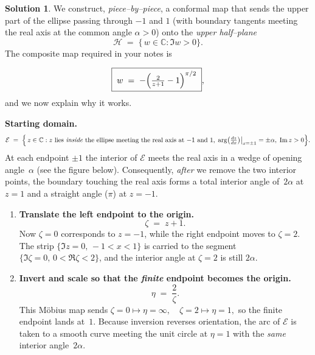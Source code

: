 \documentclass[12pt]{article}
\theoremstyle{definition} %
\newtheorem{solution}{Solution}
\theoremstyle{plain} %
\begin{document}
      \begin{solution}
        We construct, \emph{piece–by–piece}, a conformal map that sends the
        upper part of the ellipse passing through $-1$ and $1$
        (with boundary tangents meeting the real axis at the common angle
        $\alpha>0$) onto the \emph{upper half–plane}
        \[
        \mathcal H \;=\;\{\,w\in\mathbb{C} : \Im w>0\}.
        \]
        The composite map required in your notes is  
        
        \[
        \boxed{\;
           w \;=\;-\Bigl(\tfrac{2}{z+1}-1\Bigr)^{\pi/2}
         \;},
        \]
        and we now explain why it works.
        
        \bigskip
        \noindent
        \textbf{Starting domain.}
        \[
        \mathcal E
          \;=\;
          \Bigl\{\,z\in\mathbb{C} :
             \text{$z$ lies \emph{inside} the ellipse
             meeting the real axis at $-1$ and $1$,}
             \;
             \arg\bigl(\tfrac{dz}{dx}\bigr)\big|_{x=\pm1}=\pm\alpha,
             \;
             \Im z>0
          \Bigr\}.
        \]
        At each endpoint $\pm1$ the interior of $\mathcal E$
        meets the real axis in a wedge of opening
        angle~$\alpha$ (see the figure below).
        Consequently, \emph{after} we remove the two interior points,
        the boundary touching the real axis forms a total interior angle
        of~$2\alpha$ at~$z=1$ and a straight angle ($\pi$) at $z=-1$.
        
        \medskip
        \begin{enumerate}[label=\textbf{Step \arabic*:}, itemsep=1.4ex]
        
        \item  \textbf{Translate the left endpoint to the origin.}  
        \[
        \zeta
           \;=\;z+1.
        \]
        Now $\zeta=0$ corresponds to $z=-1$, while the right endpoint
        moves to $\zeta=2$.
        The strip $\bigl\{\Im z=0,\, -1<x<1\bigr\}$ is carried to the segment
        $\bigl\{\Im\zeta=0,\, 0<\Re\zeta<2\bigr\}$,
        and the interior angle at $\zeta=2$ is still $2\alpha$.
        
        \item  \textbf{Invert and scale so that the \emph{finite} endpoint
              becomes the origin.}  
        \[
        \eta
           \;=\;
           \frac{2}{\zeta}.
        \]
        This Möbius map sends
        \(
           \zeta=0\longmapsto\eta=\infty,
        \quad
           \zeta=2\longmapsto\eta=1,
        \)
        so the finite endpoint lands at~$1$.
        Because inversion reverses orientation, the arc of $\mathcal E$
        is taken to a smooth curve meeting the unit
        circle at $\eta=1$ with the \emph{same} interior angle~$2\alpha$.
        

\end{enumerate}
\end{solution}
\end{document}
